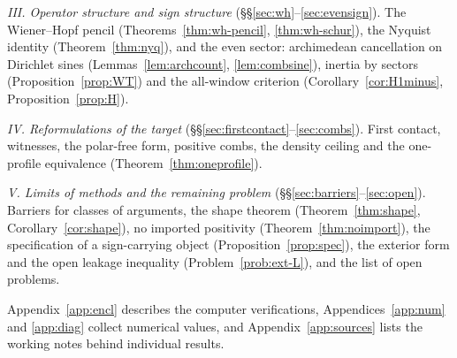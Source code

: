 \documentclass[11pt]{amsart}
\theoremstyle{definition}
\theoremstyle{remark}
\begin{document}
\emph{III. Operator structure and sign structure} (\S\S\ref{sec:wh}--\ref{sec:evensign}). The Wiener--Hopf pencil
(Theorems~\ref{thm:wh-pencil}, \ref{thm:wh-schur}), the Nyquist identity (Theorem~\ref{thm:nyq}), and the even sector:
archimedean cancellation on Dirichlet sines (Lemmas~\ref{lem:archcount}, \ref{lem:combsine}), inertia by sectors
(Proposition~\ref{prop:WT}) and the all-window criterion (Corollary~\ref{cor:H1minus}, Proposition~\ref{prop:H}).

\emph{IV. Reformulations of the target} (\S\S\ref{sec:firstcontact}--\ref{sec:combs}). First contact, witnesses, the
polar-free form, positive combs, the density ceiling and the one-profile equivalence (Theorem~\ref{thm:oneprofile}).

\emph{V. Limits of methods and the remaining problem} (\S\S\ref{sec:barriers}--\ref{sec:open}). Barriers for classes of
arguments, the shape theorem (Theorem~\ref{thm:shape}, Corollary~\ref{cor:shape}), no imported positivity
(Theorem~\ref{thm:noimport}), the specification of a sign-carrying object (Proposition~\ref{prop:spec}), the exterior form
and the open leakage inequality (Problem~\ref{prob:ext-L}), and the list of open problems.

Appendix~\ref{app:encl} describes the computer verifications, Appendices~\ref{app:num} and \ref{app:diag} collect
numerical values, and Appendix~\ref{app:sources} lists the working notes behind individual results.
\end{document}
